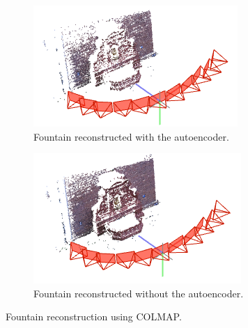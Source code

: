 \begin{figure}[H]
     \centering
     \begin{subfigure}[b]{.5\textwidth}
		\centering
		\includegraphics[width=\textwidth]{images/fountainautoenc.png}  
		\caption{\centering Fountain reconstructed with the autoencoder.}
	    	\label{fig:fountainautoenc} 
     \end{subfigure}
     \hfill
     \begin{subfigure}[b]{0.49\textwidth}
		\centering
    		\includegraphics[width=\textwidth]{images/fountaintrue.png}
		\caption{\centering Fountain reconstructed without the autoencoder.}
		\label{fig:fountaintrue}   
     \end{subfigure}
        \caption{Fountain reconstruction using COLMAP.}
        \label{fig:fountain3D}
\end{figure}



